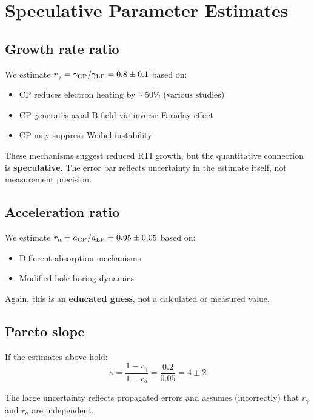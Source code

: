 \documentclass[aps,pre,twocolumn,showpacs,superscriptaddress]{revtex4-2}
\theoremstyle{definition}
\begin{document}
\section{Speculative Parameter Estimates}\label{sec:estimates}

\subsection{Growth rate ratio}

We estimate $r_\gamma = \gamma_{\rm CP}/\gamma_{\rm LP} = 0.8 \pm 0.1$ based on:
\begin{itemize}
\item CP reduces electron heating by $\sim$50\% (various studies)
\item CP generates axial B-field via inverse Faraday effect
\item CP may suppress Weibel instability
\end{itemize}

These mechanisms suggest reduced RTI growth, but the quantitative connection is \textbf{speculative}. The error bar reflects uncertainty in the estimate itself, not measurement precision.

\subsection{Acceleration ratio}

We estimate $r_a = a_{\rm CP}/a_{\rm LP} = 0.95 \pm 0.05$ based on:
\begin{itemize}
\item Different absorption mechanisms
\item Modified hole-boring dynamics
\end{itemize}

Again, this is an \textbf{educated guess}, not a calculated or measured value.

\subsection{Pareto slope}

If the estimates above hold:
\begin{equation}
\kappa = \frac{1-r_\gamma}{1-r_a} = \frac{0.2}{0.05} = 4 \pm 2
\end{equation}

The large uncertainty reflects propagated errors and assumes (incorrectly) that $r_\gamma$ and $r_a$ are independent.
\end{document}
